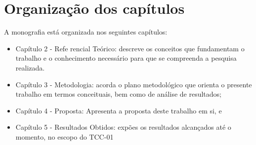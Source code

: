 \section*{Organização dos capítulos}

A monografia está organizada nos seguintes capítulos:

\begin{itemize}


        \item Capítulo 2 -  Refe rencial Teórico: descreve os conceitos que fundamentam o trabalho e o conhecimento necessário para que se compreenda a pesquisa realizada.
        \item Capítulo 3 - Metodologia: acorda o plano metodológico que orienta o presente trabalho em termos conceituais, bem como de análise de resultados;

        \item Capítulo 4 - Proposta: Apresenta a proposta deste trabalho em si, e

        \item Capítulo 5 - Resultados Obtidos: expões os resultados alcançados até o momento, no escopo do TCC-01
          
\end{itemize}
